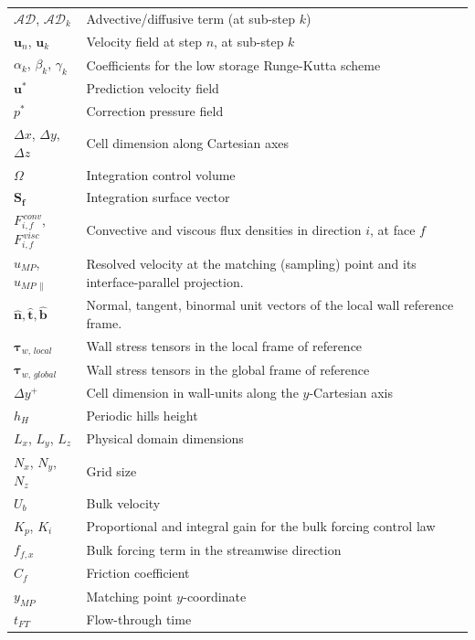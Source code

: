 \documentclass[12pt, a4paper, twoside, openright]{book}
\begin{document}
\begin{longtable}{p{} p{}}
	\addlinespace
	\addlinespace
	$\mathcal{AD}$, $\mathcal{AD}_k$			 & Advective/diffusive term (at sub-step $k$)\\
	$\bm{u}_n$, $\bm{u}_k$						 & Velocity field at step $n$, at sub-step $k$\\
	$\alpha_k$, $\beta_k$, $\gamma_k$			 & Coefficients for the low storage Runge-Kutta scheme\\
	$\bm{u}^*$ 								 	 & Prediction velocity field\\
	$p^*$										 & Correction pressure field\\
	$\Delta x$, $\Delta y$, $\Delta z$			 & Cell dimension along Cartesian axes\\
	$\Omega$									 & Integration control volume\\
	$\bm{S_f}$								 & Integration surface vector\\
	$F_{i,f}^{\, conv}$, $F_{i,f}^{\, visc}$	 & Convective and viscous flux densities in direction $i$, at face $f$\\
	$u_{MP}$, $u_{MP \, \parallel}$				 & Resolved velocity at the matching (sampling) point and its interface-parallel projection.\\
	$\bm{\hat{n}}, \bm{\hat{t}}, \bm{\hat{b}}$   & Normal, tangent, binormal unit vectors of the local wall reference frame.\\
	$\bm{\tau}_{w, \, local}$ 					 & Wall stress tensors in the local frame of reference\\
	$\bm{\tau}_{w, \, global}$					 & Wall stress tensors in the global frame of reference\\

	\addlinespace
	\addlinespace
	$\Delta y^+$								 & Cell dimension in wall-units along the $y$-Cartesian axis\\
	$h_H$										 & Periodic hills height\\
	$L_x$, $L_y$, $L_z$							 & Physical domain dimensions\\
	$N_x$, $N_y$, $N_z$							 & Grid size\\
	$U_b$										 & Bulk velocity\\
	$K_p$, $K_i$								 & Proportional and integral gain for the bulk forcing control law\\
	$f_{f,x}$									 & Bulk forcing term in the streamwise direction\\
	$C_f$										 & Friction coefficient\\
	$y_{MP}$									 & Matching point $y$-coordinate\\
	$t_{FT}$									 & Flow-through time\\


\end{longtable}
\end{document}
